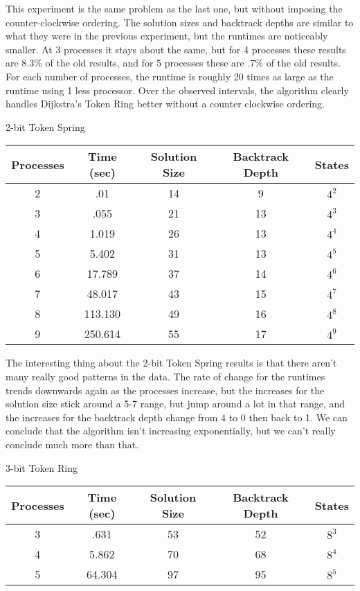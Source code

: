 This experiment is the same problem as the last one, but without imposing the counter-clockwise ordering.
The solution sizes and backtrack depths are similar to what they were in the previous experiment, but 
the runtimes are noticeably smaller.  At 3 processes it stays about the same, but for 4 processes these
results are 8.3\% of the old results, and for 5 processes these are .7\% of the old results.  For each
number of processes, the runtime is roughly 20 times as large as the runtime using 1 less processor.
Over the observed intervals, the algorithm clearly handles Dijkstra's Token Ring better without a 
counter clockwise ordering.

\begin{center}
2-bit Token Spring \\
\begin{tabular}{|c|c|c|c|c|}
\hline
 Processes & Time (sec) & Solution Size & Backtrack Depth & States \\
\hline         
 2 & .01 & 14 & 9 & $4^{2}$         \\
 3 & .055 & 21 & 13 & $4^{3}$       \\
 4 & 1.019 & 26 & 13 & $4^{4}$      \\
 5 & 5.402 & 31 & 13 & $4^{5}$      \\
 6 & 17.789 & 37 & 14 & $4^{6}$     \\
 7 & 48.017 & 43 & 15 & $4^{7}$     \\
 8 & 113.130 & 49 & 16 & $4^{8}$    \\
 9 & 250.614 & 55 & 17 & $4^{9}$    \\
\hline
\end{tabular}
\end{center}

The interesting thing about the 2-bit Token Spring results is that there aren't many really good patterns
in the data.  The rate of change for the runtimes trends downwards again as the processes increase, but
the increases for the solution size stick around a 5-7 range, but jump around a lot in that range, and
the increases for the backtrack depth change from 4 to 0 then back to 1.  We can conclude that the
algorithm isn't increasing exponentially, but we can't really conclude much more than that.

\begin{center}
3-bit Token Ring \\
\begin{tabular}{|c|c|c|c|c|}
\hline
 Processes & Time (sec) & Solution Size & Backtrack Depth & States \\
\hline         
 3 & .631 & 53 & 52 & $8^{3}$       \\
 4 & 5.862 & 70 & 68 & $8^{4}$      \\
 5 & 64.304 & 97 & 95 & $8^{5}$      \\
\hline
\end{tabular}
\end{center}

